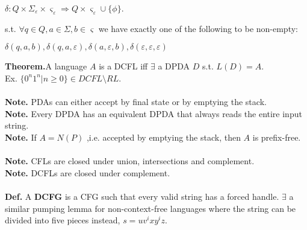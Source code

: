 \documentclass[12pt]{article}
\begin{document}
\begin{multicols}{2}
\begin{center}
$\delta : Q \times \Sigma_{\varepsilon} \times \varsigma_{\varepsilon} \Rightarrow Q \times \varsigma_{\varepsilon} \cup \lbrace \phi \rbrace.$
\end{center}
s.t. $\forall q \in Q, a \in \Sigma, b \in \varsigma$ we have exactly one of the following to be non-empty:
\begin{center}
$\delta(q,a,b), \delta(q,a,\varepsilon), \delta(a,\varepsilon,b), \delta(\varepsilon,\varepsilon,\varepsilon)$
\end{center}
\textbf{Theorem.}A language $A$ is a DCFL iff $\exists$ a DPDA $D$ s.t. $L(D) = A.$\\
Ex. $\lbrace 0^{n}1^{n} | n \geq 0 \rbrace \in DCFL \setminus RL.$\\\\
\textbf{Note.} PDAs can either accept by final state or by emptying the stack.\\
\textbf{Note.} Every DPDA has an equivalent DPDA that always reads the entire input string.\\
\textbf{Note.} If $A = N(P)$ ,i.e. accepted by emptying the stack, then $A$ is prefix-free.\\\\
\textbf{Note.} CFLs are closed under union, intersections and complement.\\
\textbf{Note.} DCFLs are closed under complement.\\\\
\textbf{Def.} A \textbf{DCFG} is a CFG such that every valid string has a forced handle.
$\exists$ a similar pumping lemma for non-context-free languages where the string can be divided into five pieces instead, $s = uv^{i}xy^{i}z.$
\end{multicols}\pagebreak
\end{document}
